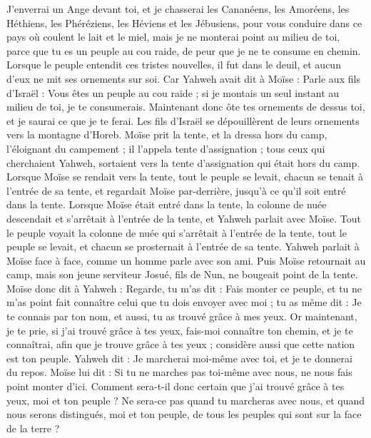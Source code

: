 \begin{multicols}{2}
J'enverrai un Ange devant toi, et je chasserai les Cananéens, les Amoréens, les Héthiens, les Phéréziens, les Héviens et les Jébusiens,
pour vous conduire dans ce pays où coulent le lait et le miel, mais je ne monterai point au milieu de toi, parce que tu es un peuple au cou raide, de peur que je ne te consume en chemin.
Lorsque le peuple entendit ces tristes nouvelles, il fut dans le deuil, et aucun d'eux ne mit ses ornements sur soi.
Car Yahweh avait dit à Moïse : Parle aux fils d'Israël : Vous êtes un peuple au cou raide ; si je montais un seul instant au milieu de toi, je te consumerais. Maintenant donc ôte tes ornements de dessus toi, et je saurai ce que je te ferai.
Les fils d'Israël se dépouillèrent de leurs ornements vers la montagne d'Horeb.
Moïse prit la tente, et la dressa hors du camp, l'éloignant du campement ; il l'appela tente d'assignation ; tous ceux qui cherchaient Yahweh, sortaient vers la tente d'assignation qui était hors du camp.
Lorsque Moïse se rendait vers la tente, tout le peuple se levait, chacun se tenait à l'entrée de sa tente, et regardait Moïse par-derrière, jusqu’à ce qu'il soit entré dans la tente.
Lorsque Moïse était entré dans la tente, la colonne de nuée descendait et s'arrêtait à l’entrée de la tente, et Yahweh parlait avec Moïse.
Tout le peuple voyait la colonne de nuée qui s’arrêtait à l’entrée de la tente, tout le peuple se levait, et chacun se prosternait à l’entrée de sa tente.
Yahweh parlait à Moïse face à face, comme un homme parle avec son ami. Puis Moïse retournait au camp, mais son jeune serviteur Josué, fils de Nun, ne bougeait point de la tente.
Moïse donc dit à Yahweh : Regarde, tu m'as dit : Fais monter ce peuple, et tu ne m'as point fait connaître celui que tu dois envoyer avec moi ; tu as même dit : Je te connais par ton nom, et aussi, tu as trouvé grâce à mes yeux.
Or maintenant, je te prie, si j'ai trouvé grâce à tes yeux, fais-moi connaître ton chemin, et je te connaîtrai, afin que je trouve grâce à tes yeux ; considère aussi que cette nation est ton peuple.
Yahweh dit : Je marcherai moi-même avec toi, et je te donnerai du repos.
Moïse lui dit : Si tu ne marches pas toi-même avec nous, ne nous fais point monter d'ici.
Comment sera-t-il donc certain que j’ai trouvé grâce à tes yeux, moi et ton peuple ? Ne sera-ce pas quand tu marcheras avec nous, et quand nous serons distingués, moi et ton peuple, de tous les peuples qui sont sur la face de la terre ?

\end{multicols}
